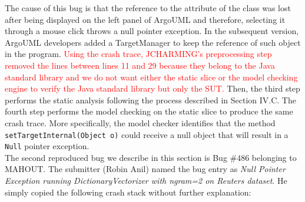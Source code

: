 \documentclass[times, doublespace]{smrauth}
\newcommand{\red}[1]{\textcolor{red}{#1}}
\begin{document}
\vspace*{0.3cm}

The cause of this bug is that the reference to the attribute of
the class was lost after being displayed on the left panel of
ArgoUML and therefore, selecting it through a mouse click
throws a null pointer exception. In the subsequent version,
ArgoUML developers added a TargetManager to keep the
reference of such object in the program. \red{Using the crash trace, JCHARMING's preprocessing step
removed the lines between lines 11 and 29 because they
belong to the Java standard library and we do not want either
the static slice or the model checking engine to verify the
Java standard library but only the SUT.} Then, the third step
performs the static analysis following the process described in
Section IV.C. The fourth step performs the model checking on
the static slice to produce the same crash trace. More
specifically, the model checker identifies that the method
{\tt setTargetInternal(Object o)} could receive a null object that
will result in a {\tt Null} pointer exception. \\

The second reproduced bug we describe in this section is Bug \#486 belonging to MAHOUT. The submitter (Robin Anil) named the bug entry as {\it Null Pointer Exception running DictionaryVectorizer with ngram=2 on Reuters dataset}. He simply copied the following crash stack without further explanation:

\vspace*{0.3cm}
\end{document}
